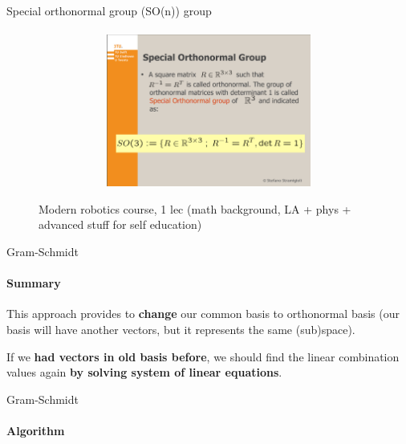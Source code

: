 \documentclass[aspectratio=169]{beamer}
\newcommand{\fbckg}[1]{\usebackgroundtemplate{\texttt{[image: \#1]}}}%
\begin{document}
\begin{frame}[t]{Special orthonormal group (SO(n)) group}
    \framesubtitle{}
    \begin{figure}[H]
        \href{https://disk.yandex.ru/i/XD6o-ZIGS4yLvA}{\centering\includegraphics[height=5cm,width=1\textwidth,keepaspectratio]{course_modern.png}}
        \caption*{Modern robotics course, 1 lec (math background, LA + phys + advanced stuff for self education)}
        \label{fig:course_modern.png}
    \end{figure}
\end{frame}

\begin{frame}[t]{Gram-Schmidt}
    \framesubtitle{Summary}
    \Large
    This approach provides to \textbf{change} our \alert{common basis} to \alert{orthonormal basis} (our basis will have another vectors, but it represents the same (sub)space).

    If we \textbf{had vectors in old basis before}, we should find the linear combination values again \textbf{by solving system of linear equations}.

\end{frame}

\begin{frame}[t]{Gram-Schmidt}
    \framesubtitle{Algorithm}
    \vspace{-0.8cm}
    \centering 
\end{frame}


\usebackgroundtemplate{}

\fbckg{fibeamer/figs/common.png}
\end{document}
